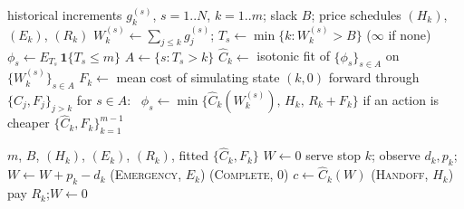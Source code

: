 \documentclass[preprint,authoryear,12pt]{elsarticle}
\theoremstyle{definition}
\theoremstyle{remark}
\begin{document}
\begin{algorithm}[t]
\caption{\textsc{Baton} offline phase: peak-aware backward induction
over the full action set}
\label{alg:offline}
\begin{algorithmic}[1]
\Require historical increments $g^{(s)}_k$, $s = 1..N$, $k = 1..m$;
         slack $B$; price schedules $(H_k)$, $(E_k)$, $(R_k)$
\State $W^{(s)}_k \gets \sum_{j\le k} g^{(s)}_j$;\quad
       $T_s \gets \min\{k : W^{(s)}_k > B\}$ ($\infty$ if none)
\State $\phi_s \gets E_{T_s}\,\mathbf 1\{T_s \le m\}$
  \State $A \gets \{s : T_s > k\}$ 
  \State $\widehat C_k \gets$ isotonic fit of $\{\phi_s\}_{s\in A}$ on
         $\{W^{(s)}_k\}_{s\in A}$
  \State $F_k \gets$ mean cost of simulating state $(k,0)$ forward
         through $\{\widehat C_j, F_j\}_{j>k}$
  \State for $s \in A$: \ $\phi_s \gets
         \min\bigl\{\widehat C_k(W^{(s)}_k),\, H_k,\, R_k + F_k\bigr\}$
         if an action is cheaper 
\EndFor
\State \Return $\{\widehat C_k, F_k\}_{k=1}^{m-1}$
\end{algorithmic}
\end{algorithm}

\begin{algorithm}[t]
\caption{\textsc{Baton} online phase: priced-action trigger}
\label{alg:online}
\begin{algorithmic}[1]
\Require $m$, $B$, $(H_k)$, $(E_k)$, $(R_k)$, fitted
         $\{\widehat C_k, F_k\}$
\State $W \gets 0$
  \State serve stop $k$; observe $d_k, p_k$;\quad $W \gets W + p_k - d_k$
   \Return (\textsc{Emergency}, $E_k$) \EndIf
   \Return (\textsc{Complete}, $0$) \EndIf
  \State $c \gets \widehat C_k(W)$
       \Return (\textsc{Handoff}, $H_k$) \EndIf
       \State pay $R_k$;\quad $W \gets 0$
  \EndIf
\EndFor
\end{algorithmic}
\end{algorithm}
\end{document}
